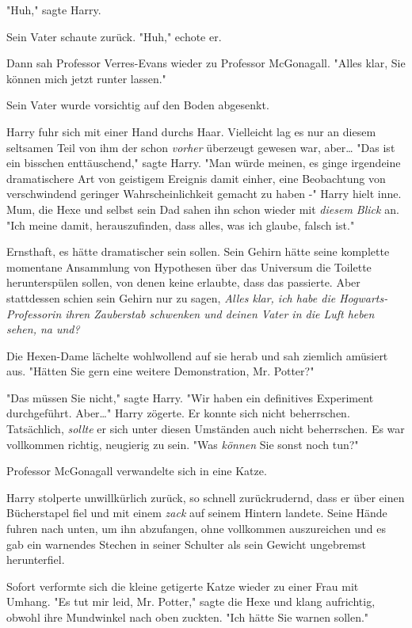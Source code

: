 {"Huh," sagte Harry.

Sein Vater schaute zurück. "Huh," echote er.

Dann sah Professor Verres-Evans wieder zu Professor McGonagall. "Alles klar, Sie können mich jetzt runter lassen."

Sein Vater wurde vorsichtig auf den Boden abgesenkt.

Harry fuhr sich mit einer Hand durchs Haar. Vielleicht lag es nur an diesem seltsamen Teil von ihm der schon \emph{vorher} überzeugt gewesen war, aber… "Das ist ein bisschen enttäuschend," sagte Harry. "Man würde meinen, es ginge irgendeine dramatischere Art von geistigem Ereignis damit einher, eine Beobachtung von verschwindend geringer Wahrscheinlichkeit gemacht zu haben -" Harry hielt inne. Mum, die Hexe und selbst sein Dad sahen ihn schon wieder mit \emph{diesem Blick} an. "Ich meine damit, herauszufinden, dass alles, was ich glaube, falsch ist."

Ernsthaft, es hätte dramatischer sein sollen. Sein Gehirn hätte seine komplette momentane Ansammlung von Hypothesen über das Universum die Toilette herunterspülen sollen, von denen keine erlaubte, dass das passierte. Aber stattdessen schien sein Gehirn nur zu sagen, \emph{Alles klar, ich habe die Hogwarts-Professorin ihren Zauberstab schwenken und deinen Vater in die Luft heben sehen, na und?}

Die Hexen-Dame lächelte wohlwollend auf sie herab und sah ziemlich amüsiert aus. "Hätten Sie gern eine weitere Demonstration, Mr. Potter?"

"Das müssen Sie nicht," sagte Harry. "Wir haben ein definitives Experiment durchgeführt. Aber…" Harry zögerte. Er konnte sich nicht beherrschen. Tatsächlich, \emph{sollte} er sich unter diesen Umständen auch nicht beherrschen. Es war vollkommen richtig, neugierig zu sein. "Was \emph{können} Sie sonst noch tun?"

Professor McGonagall verwandelte sich in eine Katze.

Harry stolperte unwillkürlich zurück, so schnell zurückrudernd, dass er über einen Bücherstapel fiel und mit einem \emph{zack} auf seinem Hintern landete. Seine Hände fuhren nach unten, um ihn abzufangen, ohne vollkommen auszureichen und es gab ein warnendes Stechen in seiner Schulter als sein Gewicht ungebremst herunterfiel.

Sofort verformte sich die kleine getigerte Katze wieder zu einer Frau mit Umhang. "Es tut mir leid, Mr. Potter," sagte die Hexe und klang aufrichtig, obwohl ihre Mundwinkel nach oben zuckten. "Ich hätte Sie warnen sollen."

}

